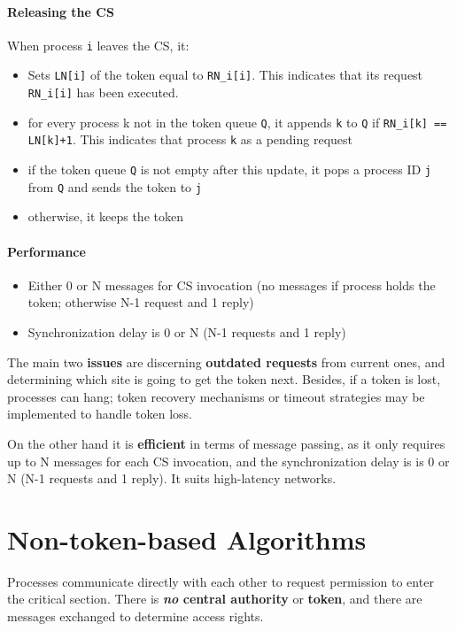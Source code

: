 \paragraph*{Releasing the CS}
When process \lstinline|i| leaves the CS, it:
\begin{itemize}
	\item Sets \lstinline|LN[i]| of the token equal to \lstinline|RN_i[i]|. This indicates that its request \lstinline|RN_i[i]| has been executed.
	\item for every process k not in the token queue \lstinline|Q|, it appends \lstinline|k| to \lstinline|Q| if \lstinline|RN_i[k] == LN[k]+1|. This indicates that process \lstinline|k| as a pending request
	\item if the token queue \lstinline|Q| is not empty after this update, it pops
   a process ID \lstinline|j| from \lstinline|Q| and sends the token to \lstinline|j|
	\item otherwise, it keeps the token
\end{itemize} 

\paragraph*{Performance}
\begin{itemize}
	\item Either 0 or N messages for CS invocation (no messages if process holds the token; otherwise N-1 request and 1 reply)
	\item Synchronization delay is 0 or N (N-1 requests and 1 reply)
\end{itemize}


The main two \textbf{issues} are discerning \textbf{outdated requests} from current ones, and determining which site is going to get the token next.
Besides, if a token is lost, processes can hang; token recovery mechanisms or
timeout strategies may be implemented to handle token loss.


On the other hand it is \textbf{efficient} in terms of message passing, as it only requires up to N messages for each CS invocation, and the synchronization delay is is 0 or N (N-1 requests and 1 reply).
It suits high-latency networks.



\section{Non-token-based Algorithms}

Processes communicate directly with each other to request permission to enter the critical section.
There is \textbf{\textit{no} central authority} or \textbf{token}, and there are messages exchanged to determine access rights.

